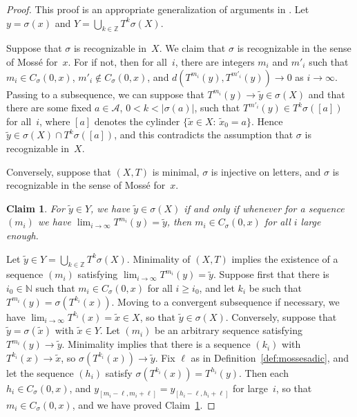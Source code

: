 \documentclass{amsart}
\newtheorem{claim}{Claim}
\theoremstyle{definition}
\theoremstyle{remark}
\numberwithin{equation}{section}
\begin{document}
\begin{proof}
This proof is an appropriate generalization of arguments in \cite{Host:1986}.
Let $y = \sigma(x)$ and $Y = \bigcup_{k\in\mathbb{Z}} T^k \sigma(X)$.

Suppose that $\sigma$ is recognizable in~$X$. 
We claim that $\sigma$ is recognizable in the sense of Moss\'{e} for~$x$. 
For if not, then for all~$i$, there are integers $m_i$ and $m'_i$ such that $m_i \in C_\sigma(0,x)$, $m'_i \notin C_\sigma(0,x)$, and $d(T^{m_i}(y),  T^{m'_i}(y)) \to 0$ as $i \to \infty$. 
Passing to a subsequence, we can suppose that $T^{m_i}(y) \to \tilde{y} \in \sigma(X)$ and that there are some fixed $a \in \mathcal{A}$, $0 < k < |\sigma(a)|$, such that $T^{m'_i}(y) \in T^k \sigma([a])$ for all~$i$, where $[a]$ denotes the cylinder $\{\tilde{x} \in X:\, \tilde{x}_0 = a\}$. 
Hence $\tilde{y} \in \sigma(X) \cap T^k \sigma([a])$, and this contradicts the assumption that $\sigma$ is recognizable in~$X$.

Conversely, suppose that $(X,T)$ is minimal, $\sigma$ is injective on letters, and $\sigma$ is recognizable in the sense of Moss\'{e} for~$x$.

\begin{claim}\label{claim1}
For $\tilde{y} \in Y$, we have $\tilde{y} \in \sigma(X)$ if and only if whenever for a sequence $(m_i)$ we have $\lim_{i\to\infty} T^{m_i}(y) = \tilde{y}$, then $m_i \in C_\sigma(0,x)$ for all $i$ large enough.
\end{claim}

Let $\tilde{y} \in Y = \bigcup_{k\in\mathbb{Z}} T^k \sigma(X)$.
Minimality of $(X,T)$ implies the existence of a sequence $(m_i)$ satisfying $\lim_{i\to\infty} T^{m_i}(y) = \tilde{y}$. 
Suppose first that there is $i_0 \in \mathbb{N}$ such that $m_i \in C_\sigma(0,x)$ for all $i \ge i_0$, and let $k_i$ be such that $T^{m_i}(y) = \sigma(T^{k_i}(x))$. 
Moving to a convergent subsequence if necessary, we have $\lim_{i\to\infty} T^{k_i}(x) = \tilde{x} \in X$, so that $\tilde{y} \in \sigma(X)$.
Conversely, suppose that $\tilde{y} = \sigma(\tilde{x})$ with $\tilde{x} \in Y$. 
Let $(m_i)$ be an arbitrary sequence satisfying $T^{m_i}(y) \to \tilde{y}$. 
Minimality implies that there is a  sequence $(k_i)$ with $T^{k_i}(x) \to \tilde{x}$, so $\sigma(T^{k_i}(x)) \to \tilde{y}$. 
Fix $\ell$ as in Definition~\ref{def:mossesadic}, and let the sequence $(h_i)$ satisfy $\sigma(T^{k_i}(x)) = T^{h_i}(y)$. 
Then each $h_i \in C_\sigma(0,x)$, and $y_{[m_i-\ell, m_i +\ell ]} = y_{[h_i-\ell, h_i +\ell ]}$ for large~$i$, so that $m_i \in C_\sigma(0,x)$, and we have proved Claim~\ref{claim1}.
 

\end{proof}
\end{document}
